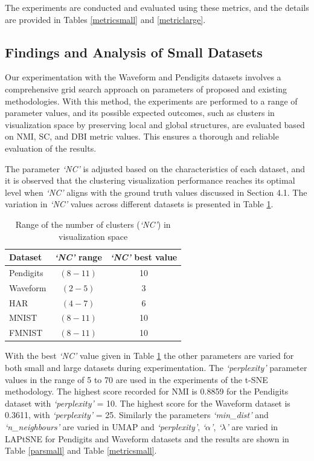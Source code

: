 The experiments are conducted and evaluated using these metrics, and the details are provided in Tables \ref{metricsmall} and \ref{metriclarge}.

\subsection{Findings and Analysis of Small Datasets}


Our experimentation with the Waveform and Pendigits datasets involves a comprehensive grid search approach on parameters of proposed and existing methodologies. With this method, the experiments are performed to a range of parameter values, and its possible expected outcomes, such as clusters in visualization space by preserving local and global structures, are evaluated based on NMI, SC, and DBI metric values. This ensures a thorough and reliable evaluation of the results.

The parameter \textit{`NC'} is adjusted based on the characteristics of each dataset, and it is observed that the clustering visualization performance reaches its optimal level when \textit{`NC'} aligns with the ground truth values discussed in Section 4.1. The variation in \textit{`NC'} values across different datasets is presented in Table \ref{ncrange}.



\begin{table}[!htbp]
 \caption{Range of the number of clusters (\textit{`NC'}) in visualization space}
    \centering
    \begin{tabular}{|l|c|c|}
        \hline
       \textbf{Dataset} & \textbf{\textit{`NC'} range} & \textbf{\textit{`NC'} best value}  \\
         \hline
        Pendigits & $(8-11)$ & 10 \\
        \hline
        Waveform & $(2-5)$ & 3 \\
        \hline
        HAR & $(4-7)$ & 6 \\
        \hline
        MNIST & $(8-11)$ & 10 \\
        \hline
        FMNIST & $(8-11)$ & 10 \\
        \hline 
    \end{tabular}
   
    \label{ncrange}
\end{table}   

With the best \textit{`NC'} value given in Table \ref{ncrange} the other parameters are varied for both small and large datasets during experimentation. The \textit{`perplexity'} parameter values in the range of 5 to 70 are used in the experiments of the t-SNE \cite{tsne} methodology. The highest score recorded for NMI is 0.8859 for the Pendigits dataset with \textit{`perplexity'} = 10. The highest score for the Waveform dataset is 0.3611, with \textit{`perplexity'} = 25. Similarly the parameters \textit{`min\_dist'} and \textit{`n\_neighbours'} are varied in UMAP \cite{umap_reference} and \textit{`perplexity'}, \textit{`$\alpha$'}, \textit{`$\lambda$'} are varied in LAPtSNE \cite{sun2023laplacian} for Pendigits and Waveform datasets and the results are shown in Table \ref{parsmall} and Table \ref{metricsmall}.

